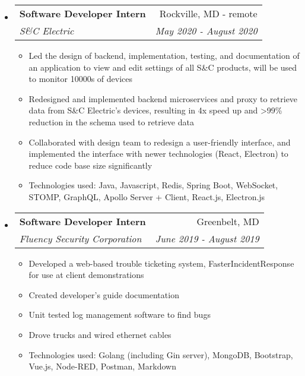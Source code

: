 \documentclass[letterpaper,10pt]{article}
\makeatletter
\newcommand{\resitem}[1]{\item #1 \vspace{-3.5pt}}
\newcommand{\ressubheading}[4]{
\begin{tabular*}{7.0in}{l@{\extracolsep{\fill}}r}
		\textbf{#1} & #2 \\
		\textit{#3} & \textit{#4} \\
\end{tabular*}\vspace{-6pt}}
\makeatother
\begin{document}
\begin{itemize}
\item
    \ressubheading{Software Developer Intern}{Rockville, MD - remote}{S\&C Electric}{May 2020 - August 2020}
    \begin{itemize}
        \resitem{Led the design of backend, implementation, testing, and documentation of an application to view and edit settings of all S\&C products, will be used to monitor 10000s of devices}
        \resitem{Redesigned and implemented backend microservices and proxy to retrieve data from S\&C Electric's devices, resulting in 4x speed up and >99\% reduction in the schema used to retrieve data}
        \resitem{Collaborated with design team to redesign a user-friendly interface, and implemented the interface with newer technologies (React, Electron) to reduce code base size significantly}
        \resitem{Technologies used: Java, Javascript, Redis, Spring Boot, WebSocket, STOMP, GraphQL, Apollo Server + Client, React.js, Electron.js}
    \end{itemize}
\item
    \ressubheading{Software Developer Intern}{Greenbelt, MD}{Fluency Security Corporation}{June 2019 - August 2019}
	\begin{itemize}
	    \resitem{Developed a web-based trouble ticketing system, FasterIncidentResponse for use at client demonstrations}
		\resitem{Created developer's guide documentation}
		\resitem{Unit tested log management software to find bugs}
		\resitem{Drove trucks and wired ethernet cables}
		\resitem{Technologies used: Golang (including Gin server), MongoDB, Bootstrap, Vue.js, Node-RED, Postman, Markdown}
	\end{itemize}
\end{itemize}
\end{document}
